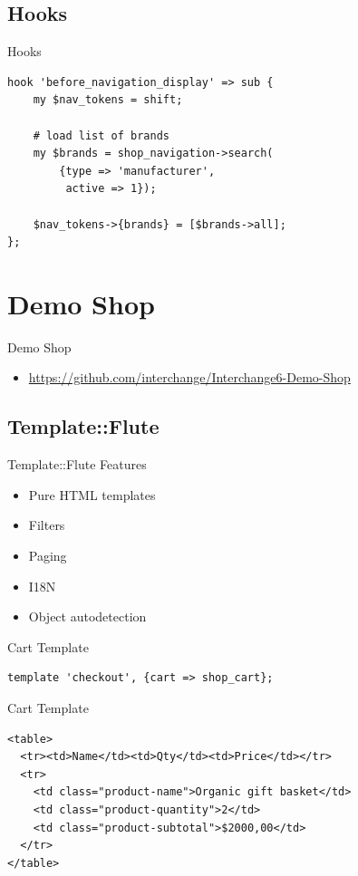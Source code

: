 \subsection{Hooks}
\begin{frame}[fragile]{Hooks}
\begin{lstlisting}
hook 'before_navigation_display' => sub {
    my $nav_tokens = shift;

    # load list of brands
    my $brands = shop_navigation->search(
        {type => 'manufacturer',
         active => 1});

    $nav_tokens->{brands} = [$brands->all];
};
\end{lstlisting}
\end{frame}

\section{Demo Shop}
\begin{frame}{Demo Shop}
\begin{itemize}
\item  \url{https://github.com/interchange/Interchange6-Demo-Shop}
\end{itemize}
\end{frame}

\subsection{Template::Flute}
\begin{frame}{Template::Flute Features}
\begin{itemize}
\item Pure HTML templates
\item Filters
\item Paging
\item I18N
\item Object autodetection
\end{itemize}
\end{frame}

\begin{frame}[fragile]{Cart Template}
\begin{lstlisting}
template 'checkout', {cart => shop_cart};
\end{lstlisting}
\end{frame}

\begin{frame}[fragile]{Cart Template}
\begin{lstlisting}
<table>
  <tr><td>Name</td><td>Qty</td><td>Price</td></tr>
  <tr>
    <td class="product-name">Organic gift basket</td>
    <td class="product-quantity">2</td>
    <td class="product-subtotal">$2000,00</td>
  </tr>
</table>
\end{lstlisting}
\end{frame}

